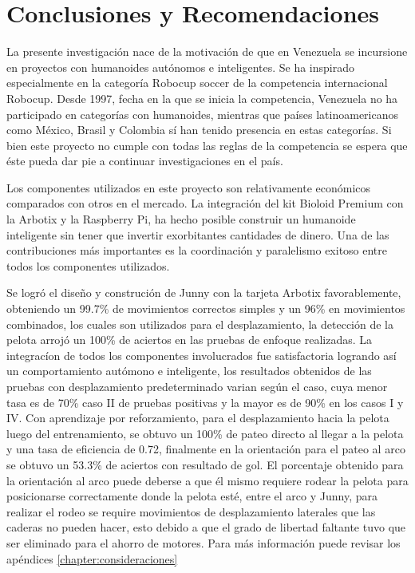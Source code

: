 \chapter{Conclusiones y Recomendaciones} \label{chapter:conclusiones}

\label{chap:conclusiones}

La presente investigación nace de la motivación de que en Venezuela se incursione en proyectos con humanoides autónomos e inteligentes. Se ha inspirado especialmente en la categoría Robocup soccer de la competencia internacional Robocup. Desde 1997, fecha en la que se inicia la competencia, Venezuela no ha participado en categorías con humanoides, mientras que países latinoamericanos como México, Brasil y Colombia sí han tenido presencia en estas categor\'ias. Si bien este proyecto no cumple con todas las reglas de la competencia se espera que éste pueda dar pie a continuar investigaciones en el pa\'is.

Los componentes utilizados en este proyecto son relativamente económicos comparados con otros en el mercado. La integración del kit Bioloid Premium con la Arbotix y la Raspberry Pi, ha hecho posible construir un humanoide inteligente sin tener que invertir exorbitantes cantidades de dinero. Una de las contribuciones más importantes es la coordinación y paralelismo exitoso entre todos los componentes utilizados.

Se logr\'o el dise\~no y construci\'on de Junny con la tarjeta Arbotix favorablemente, obteniendo un 99.7\% de movimientos correctos simples y un 96\% en movimientos combinados, los cuales son utilizados para el desplazamiento, la detecci\'on de la pelota arroj\'o un 100\% de aciertos en las pruebas de enfoque realizadas. La integrac\'ion de todos los componentes involucrados fue satisfactoria logrando as\'i un comportamiento aut\'omono e inteligente, los resultados obtenidos de las pruebas con desplazamiento predeterminado varian seg\'un el caso, cuya menor tasa es de 70\% caso II de pruebas positivas y la mayor es de 90\% en los casos I y IV. Con aprendizaje por reforzamiento, para el desplazamiento hacia la pelota luego del entrenamiento, se obtuvo un 100\% de pateo directo al llegar a la pelota y una tasa de eficiencia de 0.72, finalmente en la orientaci\'on para el pateo al arco se obtuvo un 53.3\% de aciertos con resultado de gol. 
El porcentaje obtenido para la orientaci\'on al arco puede deberse a que  \'el mismo requiere rodear la pelota para posicionarse correctamente donde la pelota est\'e, entre el arco y Junny, para realizar el rodeo se require movimientos de desplazamiento laterales que las caderas no pueden hacer, esto debido a que el grado de libertad faltante tuvo que ser eliminado para el ahorro de motores. Para m\'as informaci\'on puede revisar los ap\'endices \ref{chapter:consideraciones} 


